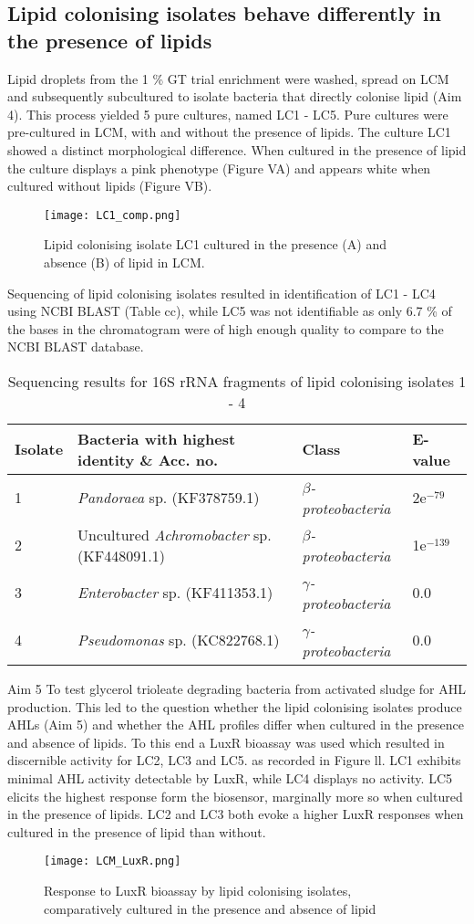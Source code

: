 \documentclass[11pt]{article}
\begin{document}
\subsection{Lipid colonising isolates behave differently in the presence of lipids}

Lipid droplets from the 1 \% GT trial enrichment were washed, spread on LCM and subsequently subcultured to isolate bacteria that directly colonise lipid (Aim 4). This process yielded 5 pure cultures, named LC1 - LC5.  Pure cultures were pre-cultured in LCM, with and without the presence of lipids. The culture LC1 showed a distinct morphological difference. When cultured in the presence of lipid the culture displays a pink phenotype (Figure VA) and appears white when cultured without lipids (Figure VB).

\begin{figure}
\texttt{[image: LC1\_comp.png]}
\caption{Lipid colonising isolate LC1 cultured in the presence (A) and absence (B) of lipid in LCM.}
\end{figure}

Sequencing of lipid colonising isolates resulted in identification of LC1 - LC4 using NCBI BLAST (Table cc), while LC5 was not identifiable as only 6.7 \% of the bases in the chromatogram were of high enough quality to compare to the NCBI BLAST database.
	
\begin{table}
\caption{Sequencing results for 16S rRNA fragments of lipid colonising isolates 1 - 4}
\begin{tabular}{ | l | p{7.8cm} | p{3cm} | l | }
\hline
Isolate & Bacteria with highest identity \& Acc. no. & Class & E-value \\
\hline
1 &  \emph{Pandoraea} sp. (KF378759.1) & \emph{$\beta$-proteobacteria} & 2e$^{-79}$ \\
\hline
2 & Uncultured \emph{Achromobacter} sp. (KF448091.1) & \emph{$\beta$-proteobacteria} & 1e$^{-139}$ \\
\hline
3 & \emph{Enterobacter} sp. (KF411353.1) & \emph{$\gamma$-proteobacteria} & 0.0 \\
\hline
4 & \emph{Pseudomonas} sp. (KC822768.1) & \emph{$\gamma$-proteobacteria} & 0.0 \\
\hline
\end{tabular}
\end{table}

Aim 5 To test glycerol trioleate degrading bacteria from activated sludge for AHL production.
This led to the question whether the lipid colonising isolates produce AHLs (Aim 5) and whether the AHL profiles differ when cultured in the presence and absence of lipids. To this end a LuxR bioassay was used which resulted in discernible activity for LC2, LC3 and LC5.  as recorded in Figure ll. LC1 exhibits minimal AHL activity detectable by LuxR, while LC4 displays no activity. LC5 elicits the highest response form the biosensor, marginally more so when cultured in the presence of lipids. LC2 and LC3 both evoke a higher LuxR responses when cultured in the presence of lipid than without.


\begin{figure}
\texttt{[image: LCM\_LuxR.png]}
\caption{Response to LuxR bioassay by lipid colonising isolates, comparatively cultured in the presence and absence of lipid }
\end{figure}
\FloatBarrier
\end{document}
